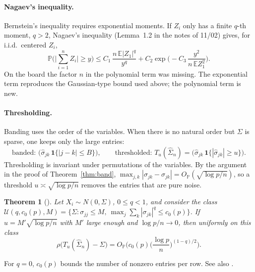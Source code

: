 \documentclass[11pt]{article}
\newtheorem{thm}{Theorem}
\newcommand{\wh}{\widehat}
\newcommand{\Prob}{\mathbb{P}}
\newcommand{\Expect}{\mathbb{E}}
\begin{document}
\paragraph{Nagaev's inequality.}

Bernstein's inequality requires exponential moments. If $Z_i$ only has a finite $q$-th moment, $q>2$, Nagaev's inequality \citep{Nag79} (Lemma~1.2 in the notes of 11/02) gives, for i.i.d.\ centered $Z_i$,
\[
\Prob\Big(\Big|\sum_{i=1}^nZ_i\Big|\ge y\Big)\le C_1\,\frac{n\,\Expect|Z_1|^q}{y^q}+C_2\exp\Big(-C_3\,\frac{y^2}{n\,\Expect Z_1^2}\Big).
\]
On the board the factor $n$ in the polynomial term was missing. The exponential term reproduces the Gaussian-type bound used above; the polynomial term is new.

\paragraph{Thresholding.}

Banding uses the order of the variables. When there is no natural order but $\Sigma$ is sparse, one keeps only the large entries:
\[
\text{banded: }\big(\wh\sigma_{jk}\,\mathbf 1\{|j-k|\le B\}\big),\qquad
\text{thresholded: }T_u(\wh\Sigma_n)=\big(\wh\sigma_{jk}\,\mathbf 1\{|\wh\sigma_{jk}|\ge u\}\big).
\]
Thresholding is invariant under permutations of the variables. By the argument in the proof of Theorem~\ref{thm:band}, $\max_{j,k}|\wh\sigma_{jk}-\sigma_{jk}|=O_\Prob(\sqrt{\log p/n})$, so a threshold $u\asymp\sqrt{\log p/n}$ removes the entries that are pure noise.


\begin{thm}[\citet{BL08b}]
Let $X_i\sim N(0,\Sigma)$, $0\le q<1$, and consider the class $\mathcal U(q,c_0(p),M)=\{\Sigma:\sigma_{jj}\le M,\ \max_j\sum_k|\sigma_{jk}|^q\le c_0(p)\}$. If $u=M'\sqrt{\log p/n}$ with $M'$ large enough and $\log p/n\to0$, then uniformly on this class
\[
\rho\big(T_u(\wh\Sigma_n)-\Sigma\big)=O_\Prob\Big(c_0(p)\Big(\frac{\log p}n\Big)^{(1-q)/2}\Big).
\]
\end{thm}

For $q=0$, $c_0(p)$ bounds the number of nonzero entries per row. See also \citet{EK08}.
\end{document}
